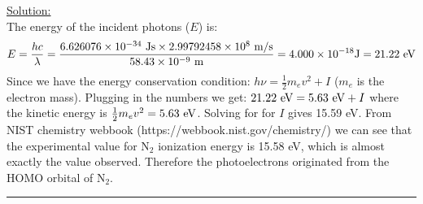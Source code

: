 \noindent
\underline{Solution:}\\

\noindent
The energy of the incident photons ($E$) is:
$$E = \frac{hc}{\lambda} = \frac{6.626076\times 10^{-34}\textnormal{ Js}\times 2.99792458\times 10^8\textnormal{ m/s}}{58.43\times 10^{-9}\textnormal{ m}} = 4.000\times 10^{-18}\textnormal{J} = 21.22\textnormal{ eV}$$
Since we have the energy conservation condition: $h\nu = \frac{1}{2}m_ev^2 + I$ ($m_e$ is the electron mass). Plugging in the numbers
we get: $21.22\textnormal{ eV} = 5.63\textnormal{ eV} + I$ where the kinetic energy is $\frac{1}{2}m_ev^2 = 5.63\textnormal{ eV}$.
Solving for for $I$ gives 15.59 eV. From NIST chemistry webbook (https://webbook.nist.gov/chemistry/) we can see that the experimental
value for N$_2$ ionization energy is 15.58 eV, which is almost exactly the value observed. Therefore the photoelectrons originated
from the HOMO orbital of N$_2$.

\hrule\vspace{0.5cm}



